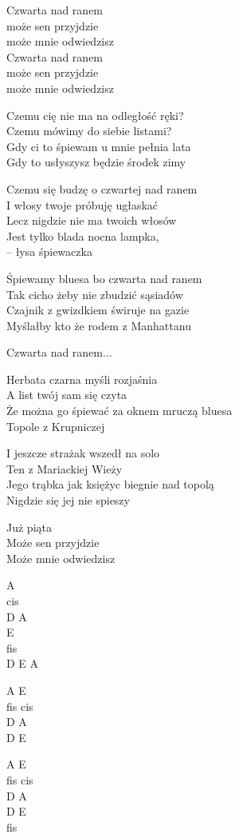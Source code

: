 \begin{text}
    \vin Czwarta nad ranem\\
    \vin może sen przyjdzie\\
    \vin może mnie odwiedzisz\\
    \vin Czwarta nad ranem\\
    \vin może sen przyjdzie\\
    \vin może mnie odwiedzisz

    Czemu cię nie ma na odległość ręki?\\
    Czemu mówimy do siebie listami?\\
    Gdy ci to śpiewam u mnie pełnia lata\\
    Gdy to usłyszysz będzie środek zimy

    Czemu się budzę o czwartej nad ranem\\
    I włosy twoje próbuję ugłaskać\\
    Lecz nigdzie nie ma twoich włosów\\
    Jest tylko blada nocna lampka,\\
    – łysa śpiewaczka

    Śpiewamy bluesa bo czwarta nad ranem\\
    Tak cicho żeby nie zbudzić sąsiadów\\
    Czajnik z gwizdkiem świruje na gazie\\
    Myślałby kto że rodem z Manhattanu

    \vin Czwarta nad ranem...

    Herbata czarna myśli rozjaśnia\\
    A list twój sam się czyta\\
    Że można go śpiewać za oknem mruczą bluesa\\
    Topole z Krupniczej

    I jeszcze strażak wszedł na solo\\
    Ten z Mariackiej Wieży\\
    Jego trąbka jak księżyc biegnie nad topolą\\
    Nigdzie się jej nie spieszy

    \vin Już piąta\\
    \vin Może sen przyjdzie\\
    \vin Może mnie odwiedzisz
\end{text}
\begin{chord}
    A\\
    cis\\
    D A\\
    E\\
    fis\\
    D E A

    A E\\
    fis cis\\
    D A\\
    D E

    A E\\
    fis cis\\
    D A\\
    D E\\
    fis
\end{chord}